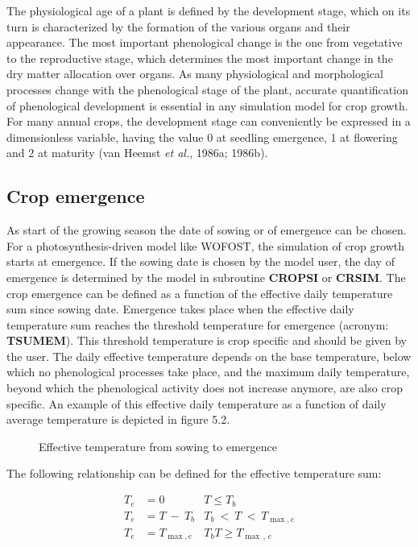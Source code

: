 The physio\-logical age of a plant is defined by the development stage, which on its turn is
characterized by the forma\-tion of the various organs and their appear\-ance. The most
important phenological change is the one from vegetative to the reproduc\-tive stage, which
determines the most important change in the dry matter allocation over organs. As many
physiologi\-cal and morphological processes change with the phenological stage of the
plant, accurate quantification of phenological development is essential in any simulation
model for crop growth. For many annual crops, the development stage can conveniently
be expressed in a dimensionless variable, having the value 0 at seedling emergence, 1 at
flowering and 2 at maturity (van Heemst {\it et al.}, 1986a; 1986b). 

\subsection{Crop emergence  }

As start of the growing season the date of sowing or of emergence can be chosen. For a
photosynthesis-driven model like WOFOST, the simulation of crop growth starts at
emergence. If the sowing date is chosen by the model user, the day of emergence is
determined by the model in subroutine {\bf CROPSI} or {\bf CRSIM}. The crop emer\-gence can be
defined as a function of the effective daily temperature sum since sowing date. Emergence
takes place when the effective daily temperature sum reaches the threshold temperature
for emergence (acronym: {\bf TSUMEM}). This threshold temperature is crop specific and
should be given by the user. The daily effective temperature depends on the base
tempera\-ture, below which no phenologi\-cal process\-es take place, and the maximum daily
tempera\-ture, beyond which the phenological activity does not increase anymore, are also
crop specific. An example of this effective daily tempera\-ture as a function of daily
average temperature is depicted in figure 5.2.

\begin{figure}[htbp]
\caption{Effective temperature from sowing to emergence}
 \begin{center} \end{center}
\end{figure}

The following relationship can be defined for the effective temperature sum:

\begin{align}
T_{e} &= 0            & T \le T _{b} \nonumber  \\
T_{e} &= T~-~ T _{b}  & T _{b} ~<~T ~ < ~T _{\max ,e} \nonumber  \\
T_{e} &= T _{\max ,e} & T _{b} T \ge  T _{\max \, ,\, e}
\end{align}

